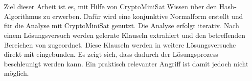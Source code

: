\section*{\abstractname}

Ziel dieser Arbeit ist es, mit Hilfe von CryptoMiniSat Wissen über den Hash-Algorithmus 
zu erwerben. Dafür wird eine konjunktive Normalform erstellt und für die Analyse mit CryptoMiniSat genutzt.
Die Analyse erfolgt iterativ. Nach einem Lösungsversuch werden gelernte Klauseln extrahiert und den
betreffenden Bereichen von  zugeordnet. Diese Klauseln werden in weitere Lösungsversuche direkt
mit eingebunden. Es zeigt sich, dass dadurch der Lösungsprozess beschleunigt werden kann. Ein praktisch
relevanter Angriff ist damit jedoch nicht möglich.